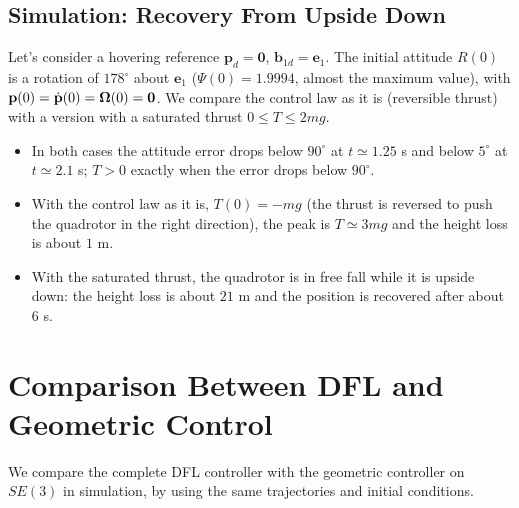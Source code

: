 \documentclass[10pt, a4paper]{report}
\begin{document}
\subsection{Simulation: Recovery From Upside Down}
Let's consider a hovering reference $\mathbf p_d=\mathbf 0$, $\mathbf b_{1d}=\mathbf e_1$. The initial attitude $R(0)$ is a rotation of $178^\circ$ about $\mathbf e_1$ ($\Psi(0)=1.9994$, almost the maximum value), with $\mathbf p(0)=\dot{\mathbf p}(0)={\boldsymbol{\Omega}}(0)=\mathbf 0$. We compare the control law as it is (reversible thrust) with a version with a saturated thrust $0\le T\le2mg$.\begin{itemize}
    \item In both cases the attitude error drops below $90^\circ$ at $t\simeq1.25$ s and below $5^\circ$ at $t\simeq2.1$ s; $T>0$ exactly when the error drops below $90^\circ$.
    \item With the control law as it is, $T(0)=-mg$ (the thrust is reversed to push the quadrotor in the right direction), the peak is $T\simeq3mg$ and the height loss is about $1$ m.
    \item With the saturated thrust, the quadrotor is in free fall while it is upside down: the height loss is about $21$ m and the position is recovered after about $6$ s.
\end{itemize}
\section{Comparison Between DFL and Geometric Control}
We compare the complete DFL controller with the geometric controller on $SE(3)$ in simulation, by using the same trajectories and initial conditions.\bigskip
\end{document}
